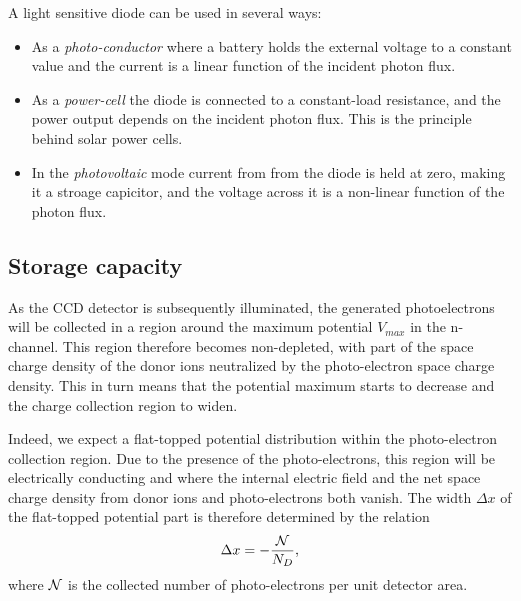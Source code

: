 A light sensitive diode can be used in several ways:
\begin{itemize}
\item As a {\it photo-conductor} where a battery holds the external voltage
  to a constant value and the current is a linear function of the
  incident photon flux.
\item As a {\it power-cell} the diode is connected to a constant-load
  resistance, and the power output depends on the incident photon
  flux. This is the principle behind solar power cells.
\item In the {\it photovoltaic} mode current from from the diode
  is held at zero, making it a stroage capicitor, and the voltage
  across it is a non-linear function of the photon flux.
\end{itemize}

\subsection{Storage capacity}

As the CCD detector is subsequently illuminated, the generated
photoelectrons will be collected in a region around the maximum
potential $V_{max}$ in the n-channel. This region therefore becomes
non-depleted, with part of the space charge density of the donor ions
neutralized by the photo-electron space charge density. This in turn
means that the potential maximum starts to decrease and the charge
collection region to widen. 

Indeed, we expect a flat-topped potential distribution within the
photo-electron collection region. Due to the presence of the
photo-electrons, this region will be electrically conducting and where
the internal electric field and the net space charge density
from donor ions and photo-electrons both vanish. The width $\Delta x$
of the flat-topped potential part is therefore determined by the
relation
\begin{equation}
  \Delta x = -\frac{{\cal N}}{N_D},
\end{equation}
where ${\cal N}$ is the collected number of photo-electrons per unit
detector area.

